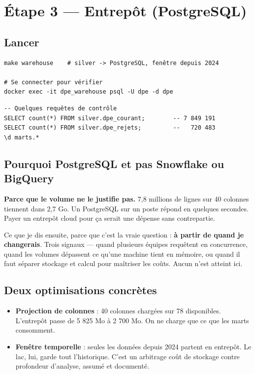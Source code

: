 \documentclass[11pt,a4paper]{article}
\begin{document}
\newpage
\section{Étape 3 — Entrepôt (PostgreSQL)}

\subsection{Lancer}

\begin{lstlisting}[style=sh]
make warehouse    # silver -> PostgreSQL, fenêtre depuis 2024

# Se connecter pour vérifier
docker exec -it dpe_warehouse psql -U dpe -d dpe
\end{lstlisting}

\begin{lstlisting}[style=sql]
-- Quelques requêtes de contrôle
SELECT count(*) FROM silver.dpe_courant;        -- 7 849 191
SELECT count(*) FROM silver.dpe_rejets;         --   720 483
\d marts.*
\end{lstlisting}

\subsection{Pourquoi PostgreSQL et pas Snowflake ou BigQuery}

\begin{pourquoi}
\textbf{Parce que le volume ne le justifie pas.} 7,8 millions de lignes sur
40 colonnes tiennent dans 2,7 Go. Un PostgreSQL sur un poste répond en
quelques secondes. Payer un entrepôt cloud pour ça serait une dépense sans
contrepartie.

Ce que je dis ensuite, parce que c'est la vraie question : \textbf{à partir de
quand je changerais}. Trois signaux — quand plusieurs équipes requêtent en
concurrence, quand les volumes dépassent ce qu'une machine tient en mémoire,
ou quand il faut séparer stockage et calcul pour maîtriser les coûts. Aucun
n'est atteint ici.
\end{pourquoi}

\subsection{Deux optimisations concrètes}

\begin{itemize}
  \item \textbf{Projection de colonnes} : 40 colonnes chargées sur 78
        disponibles. L'entrepôt passe de 5 825 Mo à 2 700 Mo. On ne charge que
        ce que les marts consomment.
  \item \textbf{Fenêtre temporelle} : seules les données depuis 2024 partent
        en entrepôt. Le lac, lui, garde tout l'historique. C'est un arbitrage
        coût de stockage contre profondeur d'analyse, assumé et documenté.
\end{itemize}
\end{document}
